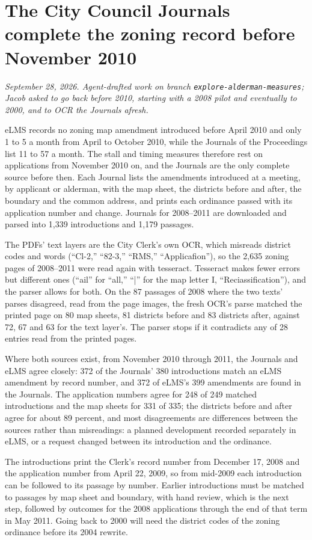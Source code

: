 \clearpage
\section*{The City Council Journals complete the zoning record before November 2010}
\textit{September 28, 2026. Agent-drafted work on branch \texttt{explore-alderman-measures}; Jacob asked to go back
before 2010, starting with a 2008 pilot and eventually to 2000, and to OCR the Journals afresh.}

eLMS records no zoning map amendment introduced before April 2010 and only 1 to 5 a month from April to October
2010, while the Journals of the Proceedings list 11 to 57 a month. The stall and timing measures therefore rest on
applications from November 2010 on, and the Journals are the only complete source before then. Each Journal lists
the amendments introduced at a meeting, by applicant or alderman, with the map sheet, the districts before and after,
the boundary and the common address, and prints each ordinance passed with its application number and change.
Journals for 2008--2011 are downloaded and parsed into 1,339 introductions and 1,179 passages.

The PDFs' text layers are the City Clerk's own OCR, which misreads district codes and words (``Cl-2,'' ``82-3,''
``RMS,'' ``Applicafion''), so the 2,635 zoning pages of 2008--2011 were read again with tesseract. Tesseract makes
fewer errors but different ones (``ail'' for ``all,'' ``|'' for the map letter I, ``Reciassification''), and the
parser allows for both. On the 87 passages of 2008 where the two texts' parses disagreed, read from the page images,
the fresh OCR's parse matched the printed page on 80 map sheets, 81 districts before and 83 districts after, against
72, 67 and 63 for the text layer's. The parser stops if it contradicts any of 28 entries read from the printed pages.

Where both sources exist, from November 2010 through 2011, the Journals and eLMS agree closely: 372 of the Journals'
380 introductions match an eLMS amendment by record number, and 372 of eLMS's 399 amendments are found in the
Journals. The application numbers agree for 248 of 249 matched introductions and the map sheets for 331 of 335; the
districts before and after agree for about 89 percent, and most disagreements are differences between the sources
rather than misreadings: a planned development recorded separately in eLMS, or a request changed between its
introduction and the ordinance.

The introductions print the Clerk's record number from December 17, 2008 and the application number from April 22,
2009, so from mid-2009 each introduction can be followed to its passage by number. Earlier introductions must be
matched to passages by map sheet and boundary, with hand review, which is the next step, followed by outcomes for
the 2008 applications through the end of that term in May 2011. Going back to 2000 will need the district codes of
the zoning ordinance before its 2004 rewrite.

